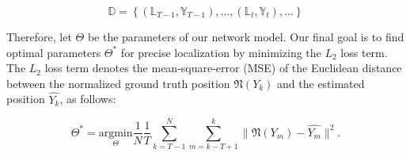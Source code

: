\documentclass[letterpaper, 10 pt, conference]{ieeeconf}
\begin{document}
\begin{equation}
\mathbb{D} = \left\{(\mathbb{L}_{T-1}, \mathbb{Y}_{T-1}),...,(\mathbb{L}_t, \mathbb{Y}_t),...\right\} 
\end{equation}

Therefore, let $\Theta$ be the parameters of our network model. Our final goal is to find optimal parameters $\Theta^{*}$ for precise localization by minimizing the $L_2$ loss term. The $L_2$ loss term denotes the mean-square-error (MSE) of the Euclidean distance between the normalized ground truth position $\mathfrak{N}(Y_k)$ and the estimated position $\hat{Y_k}$, as follows:

\begin{equation}
\Theta^{*} = \underset{\Theta}{\mathrm{argmin}} \frac{1}{N}\frac{1}{T} \sum_{k=T-1}^N\sum_{m=k-T+1}^k \parallel \mathfrak{N}(Y_m) - \hat{Y_m} \parallel^{2}.
\end{equation}  
\end{document}
